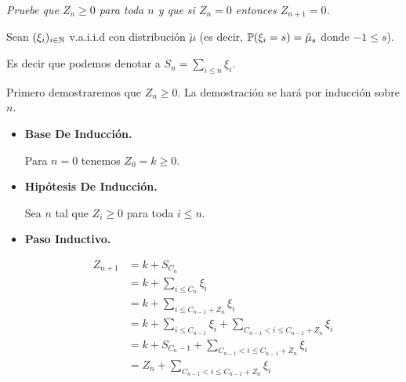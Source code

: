 \emph{
    Pruebe que $Z_n\geq 0$ para toda $n$ y que si $Z_n=0$ entonces $Z_{n+1}=0$.
}

\afterstatement\par\null

Sean $(\xi_i)_{i \in \mathbb{N}}$ v.a.i.i.d con distribución $\tilde\mu$ 
(es decir, $\mathbb{P}(\xi_i = s) = \tilde\mu_s$ donde $-1 \leq s$).\par\null

Es decir que podemos denotar a $S_n = \sum_{i \leq n} \xi_i$.\par\null

Primero demostraremos que $Z_n \geq 0$. La demostración se hará por inducción sobre $n$.

\begin{itemize}
	\item 
        \textbf{Base De Inducción.}
        
        Para $n = 0$ tenemos $Z_0 = k \geq 0$.\par\null
        
    \item
        \textbf{Hipótesis De Inducción.}
        
        Sea $n$ tal que $Z_i \geq 0$ para toda $i \leq n$.\par\null
        
    \item
        \textbf{Paso Inductivo.}
        
        \begin{align}
            Z_{n+1}     &=  k + S_{C_n}                                                                             \\
                        &=  k + \sum_{i \leq C_n} \xi_i                                                             \\
                        &=  k + \sum_{i \leq C_{n-1} + Z_{n}} \xi_i                                                 \\
                        &=  k + \sum_{i \leq C_{n-1}} \xi_i + \sum_{C_{n-1} < i \leq  C_{n-1} + Z_{n}} \xi_i        \\
                        &=  k + S_{C_n-1} + \sum_{C_{n-1} < i \leq  C_{n-1} +Z_{n}} \xi_i                           \\
                        &=  Z_n + \sum_{C_{n-1} < i \leq  C_{n-1} + Z_{n}} \xi_i                                    \\                        
        \end{align}
        

\end{itemize}
